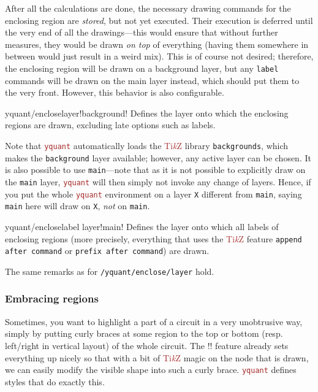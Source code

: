 \documentclass{scrartcl}
\makeatletter
\let\unpatched@minted@inline@iii=\minted@inline@iii%
\def\patched@minted@inline@iii#1{%
      \unpatched@minted@inline@iii{#1}%
      \par%
      \endgroup\egroup\nopagebreak\vskip-\parskip\nopagebreak%
      \noindent\ignorespaces%
   }
\def\patch@mintinline{%
      \let\minted@inline@iii=\patched@minted@inline@iii%
   }
\let\unpatched@RobustMintInlineProcess@ii=\RobustMintInlineProcess@ii
\def\patched@RobustMintInlineProcess@ii#1{%
      \unpatched@RobustMintInlineProcess@ii{#1}%
      \par%
      \endgroup\egroup\nopagebreak\vskip-\parskip\nopagebreak%
      \noindent\ignorespaces%
   }
\def\patch@mintinline{%
      \let\RobustMintInlineProcess@ii=\patched@RobustMintInlineProcess@ii%
   }
\newenvironment{option*}[3][]{\ifhmode\par\fi\addvspace{5mm}%
   \vbox\bgroup\begingroup%
      \patch@mintinline%
      \raggedleft%
      \hspace*{-1cm}%
      \phantomsection\label{yquant:/#2/#3}%
      \texttt{\ifstrempty{#1}\relax{\compat{#1}}\textcolor{gray}{/#2/}\textcolor{mintgreen}{#3}}\hfill default: %
      \tex}{\par\addvspace{5mm}}
\def\TikZ{\textcolor{brown}{Ti\textit kZ}}
\def\pkg#1{\textcolor{brown}{\texttt{#1}}}
\def\ttlink{\link\texttt}
\def\Yquant{\pkg{yquant}}
\makeatother
\begin{document}

            After all the calculations are done, the necessary drawing commands for the enclosing region are \emph{stored}, but not yet executed.
            Their execution is deferred until the very end of all the drawings---this would ensure that without further measures, they would be drawn \emph{on top} of everything (having them somewhere in between would just result in a weird mix).
            This is of course not desired; therefore, the enclosing region will be drawn on a background layer, but any \texttt{label} commands will be drawn on the main layer instead, which should put them to the very front.
            However, this behavior is also configurable.

            \begin{option*}{yquant/enclose}{layer}!background!
               Defines the layer onto which the enclosing regions are drawn, excluding late options such as labels.

               Note that \Yquant{} automatically loads the \TikZ{} library \texttt{backgrounds}, which makes the \texttt{background} layer available; however, any active layer can be chosen.
               It is also possible to use \texttt{main}---note that as it is not possible to explicitly draw on the \texttt{main} layer, \Yquant{} will then simply not invoke any change of layers.
               Hence, if you put the whole \Yquant{} environment on a layer \texttt{X} different from \texttt{main}, saying \texttt{main} here will draw on \texttt{X}, \emph{not} on \texttt{main}.
            \end{option*}

            \begin{option*}{yquant/enclose}{label layer}!main!
               Defines the layer onto which all labels of enclosing regions (more precisely, everything that uses the \TikZ{} feature \texttt{append after command} or \texttt{prefix after command}) are drawn.

               The same remarks as for \ttlink{/yquant/enclose/layer} hold.
            \end{option*}

         \subsubsection{Embracing regions}
            Sometimes, you want to highlight a part of a circuit in a very unobtrusive way, simply by putting curly braces at some region to the top or bottom (resp. left/right in vertical layout) of the whole circuit.
            The \tex!\encloseall! feature already sets everything up nicely so that with a bit of \TikZ{} magic on the node that is drawn, we can easily modify the visible shape into such a curly brace.
            \Yquant{} defines styles that do exactly this.
\end{document}

